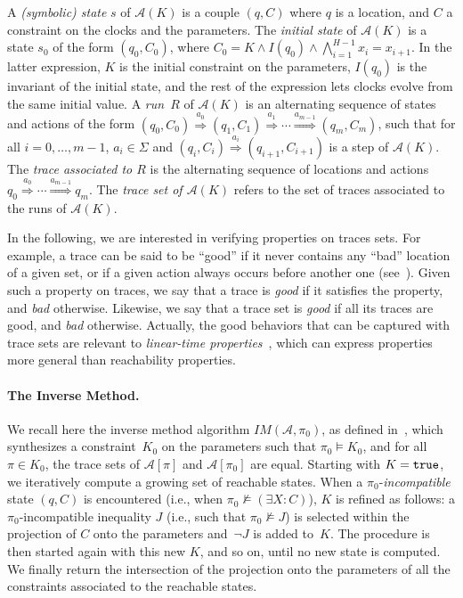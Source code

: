 \documentclass[submission,copyright,creativecommons]{eptcs}
\newcommand{\A}{\mathcal{A}}
\newcommand{\Fleche}[1]{\stackrel{#1}{\Rightarrow}}
\newcommand{\true}{{\tt true}}
\newcommand{\IM}{\mathit{IM}}
\newcommand{\paragraphe}[1]{\paragraph{#1.}}
\begin{document}
A {\em (symbolic) state} $s$ of $\A(K)$ is a couple $(q, C)$ where $q$ is a location, and $C$ a constraint on the clocks and the parameters.
The \emph{initial state} of $\A(K)$ is a state $s_{0}$ of the form $ (q_{0}, C_{0})$,
where $C_{0} = K \land I(q_0) \land \bigwedge_{i = 1}^{H-1} x_i = x_{i+1}$.
In the latter expression, $K$ is the initial constraint on the parameters, $I(q_0)$ is the invariant of the initial state, and the rest of the expression lets clocks evolve from the same initial value.
A {\em run}~$R$ of $\A(K)$ is an alternating sequence of states and actions of the form
$(q_0, C_0) \Fleche{a_0} (q_1, C_1) \Fleche {a_1} \cdots \Fleche{a_{m-1}} (q_m, C_m)$,
such that for all $i = 0, \dots, m-1$,
$a_i \in \Sigma$ and $(q_i, C_i) \Fleche{a_i} (q_{i+1}, C_{i+1})$ is a step of $\A(K)$.
The \emph{trace associated to $R$} is the alternating sequence of locations and actions
$q_0 \Fleche{a_0} \cdots \Fleche{a_{m-1}} q_m$.
The \emph{trace set of $\A(K)$} refers to the set of traces associated to the runs of $\A(K)$.

In the following, we are interested in verifying properties on traces sets.
For example,
a trace can be said to be ``good'' if it never contains any ``bad'' location of a given set,
or if a given action always occurs before another one (see~\cite{af10}).
Given such a property on traces, we say that a trace is \emph{good} if it satisfies the property, and \emph{bad} otherwise.
Likewise, we say that a trace set is \emph{good} if all its traces are good, and \emph{bad} otherwise.
Actually, the good behaviors that can be captured with trace sets are relevant to {\em linear-time properties}~\cite{bk08}, which can express properties more general than reachability properties.





\paragraphe{The Inverse Method} \label{ss:im}






We recall here the inverse method algorithm $\IM(\A, \pi_0)$, as defined in~\cite{acef09}, which synthesizes a constraint~$K_0$ on the parameters such that $\pi_0 \models K_0$, and for all $\pi \in K_0$, the trace sets of $\A[\pi]$ and $\A[\pi_0]$ are equal.
Starting with $K = \true$,
we iteratively compute a growing set of reachable states.
When a $\pi_0$-\emph{incompatible} state $(q, C)$ is encountered (i.e., when \mbox{$\pi_0 \not \models (\exists X: C)$}), $K$ is refined as follows:
a $\pi_0$-incompatible inequality $J$ (i.e., such that \mbox{$\pi_0 \not \models J$}) is selected within the projection of $C$ onto the parameters and~$\neg J$ is added to~$K$.
The procedure is then started again with this new $K$, and so on, until no new state is computed.
We finally return the intersection of the projection onto the parameters of all the constraints associated to the reachable states.
\end{document}
